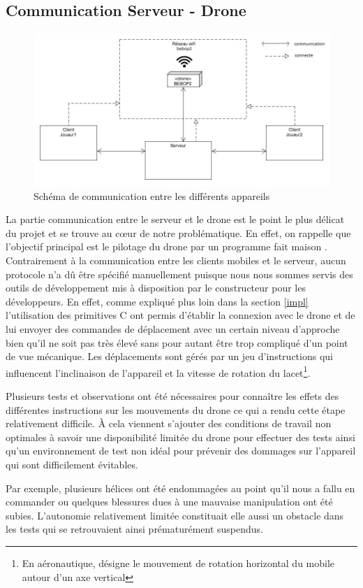 \subsection{Communication Serveur - Drone}

\begin{figure}[ht]
\begin{center}
\includegraphics[scale=0.45]{images/architecture.jpg}
\caption{Schéma de communication entre les différents appareils}
\end{center}
\end{figure}

La partie communication entre le serveur et le drone est le point le plus délicat du projet et se trouve au c\oe{}ur de notre problématique. En effet, on rappelle que l'objectif principal est le pilotage du drone par un programme \og fait maison \fg{}. Contrairement à la communication entre les clients mobiles et le serveur, aucun protocole n'a dû être spécifié manuellement puisque nous nous sommes servis des outils de développement mis à disposition par le constructeur pour les développeurs. En effet, comme expliqué plus loin dans la section \ref{impl} l'utilisation des primitives C ont permis d'établir la connexion avec le drone et de lui envoyer des commandes de déplacement avec un certain niveau d'approche bien qu'il ne soit pas très élevé sans pour autant être trop compliqué d'un point de vue mécanique. Les déplacements sont gérés par un jeu d'instructions qui influencent l'inclinaison de l'appareil et la vitesse de rotation du lacet\footnote{En aéronautique, désigne le mouvement de rotation horizontal du mobile autour d'un axe vertical}. 

Plusieurs tests et observations ont été nécessaires pour connaître les effets des différentes instructions sur les mouvements du drone ce qui a rendu cette étape relativement difficile. À cela viennent s'ajouter des conditions de travail non optimales à savoir une disponibilité limitée du drone pour effectuer des tests ainsi qu'un environnement de test non idéal pour prévenir des dommages sur l'appareil qui sont difficilement évitables.

Par exemple, plusieurs hélices ont été endommagées au point qu'il nous a fallu en commander ou quelques blessures dues à une mauvaise manipulation ont été subies. L'autonomie relativement limitée constituait elle aussi un obstacle dans les tests qui se retrouvaient ainsi prématurément suspendus.

